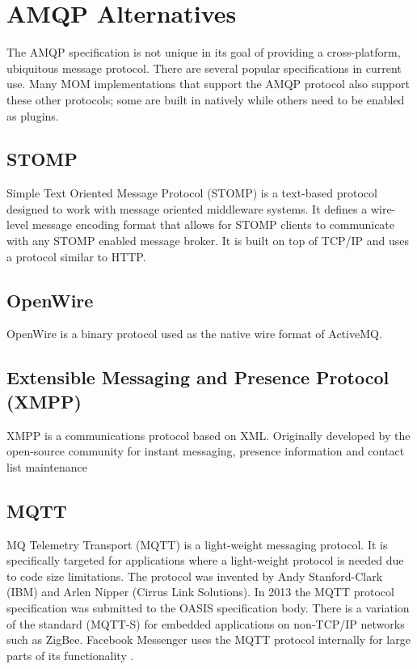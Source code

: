 \documentclass{thesis}
\begin{document}
\section{AMQP Alternatives}
The AMQP specification is not unique in its goal of providing a cross-platform, ubiquitous message protocol.  There are several popular specifications in current use.  Many MOM implementations that support the AMQP protocol also support these other protocols; some are built in natively while others need to be enabled as plugins.   

\subsection{STOMP}
Simple Text Oriented Message Protocol (STOMP) is a text-based protocol designed to work with message oriented middleware systems.  It defines a wire-level message encoding format that allows for STOMP clients to communicate with any STOMP enabled message broker.  It is built on top of TCP/IP and uses a protocol similar to HTTP.  %

\subsection{OpenWire}
OpenWire is a binary protocol used as the native wire format of ActiveMQ.  %

\subsection{Extensible Messaging and Presence Protocol (XMPP)}
XMPP is a communications protocol based on XML.  Originally developed by the open-source community for instant messaging, presence information and contact list maintenance \cite{XMPP}  

\subsection{MQTT}
MQ Telemetry Transport (MQTT) is a light-weight messaging protocol.  It is specifically targeted for applications where a light-weight protocol is needed due to code size limitations.  The protocol was invented by Andy Stanford-Clark (IBM) and Arlen Nipper (Cirrus Link Solutions).  In 2013 the MQTT protocol specification was submitted to the OASIS specification body.  There is a variation of the standard (MQTT-S) for embedded applications on non-TCP/IP networks such as ZigBee.  Facebook Messenger uses the MQTT protocol internally for large parts of its functionality \cite{MQTT}. 
\end{document}
